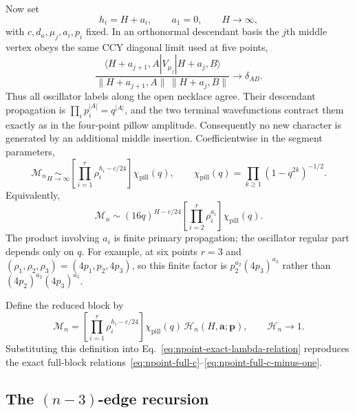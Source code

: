 \documentclass[11pt]{article}
\newcommand{\cH}{\mathcal H}
\newcommand{\cM}{\mathcal M}
\begin{document}
Now set
\begin{equation}
 h_i=H+a_i,\qquad a_1=0,\qquad H\longrightarrow\infty,
 \label{eq:npoint-diagonal-limit}
\end{equation}
with $c,d_a,\mu_j,a_i,p_i$ fixed.  In an orthonormal descendant basis the
$j$th middle vertex obeys the same CCY diagonal limit used at five points,
\begin{equation}
 \frac{\langle H+a_{j+1},A|V_{\mu_j}|H+a_j,B\rangle}
 {\|H+a_{j+1},A\|\,\|H+a_j,B\|}
 \longrightarrow\delta_{AB}.
 \label{eq:npoint-diagonal-vertex}
\end{equation}
Thus all oscillator labels along the open necklace agree.  Their descendant
propagation is
$\prod_i p_i^{|A|}=q^{|A|}$, and the two terminal wavefunctions contract
them exactly as in the four-point pillow amplitude.  Consequently no new
character is generated by an additional middle insertion.  Coefficientwise
in the segment parameters,
\begin{equation}
\boxed{
 \cM_n
 \underset{H\to\infty}{\sim}
 \left[\prod_{i=1}^{r}\rho_i^{h_i-c/24}\right]
 \chi_{\mathrm{pill}}(q),
 \qquad
 \chi_{\mathrm{pill}}(q)=
 \prod_{k\geq1}(1-q^{2k})^{-1/2}.}
 \label{eq:npoint-large-h}
\end{equation}
Equivalently,
\begin{equation}
 \cM_n\sim
 (16q)^{H-c/24}
 \left[\prod_{i=2}^{r}\rho_i^{a_i}\right]
 \chi_{\mathrm{pill}}(q).
 \label{eq:npoint-large-h-fixed-differences}
\end{equation}
The product involving $a_i$ is finite primary propagation; the oscillator
regular part depends only on $q$.  For example, at six points
$r=3$ and $(\rho_1,\rho_2,\rho_3)=(4p_1,p_2,4p_3)$, so this finite factor is
$p_2^{a_2}(4p_3)^{a_3}$ rather than $(4p_2)^{a_2}(4p_3)^{a_3}$.

Define the reduced block by
\begin{equation}
 \cM_n=
 \left[\prod_{i=1}^{r}\rho_i^{h_i-c/24}\right]
 \chi_{\mathrm{pill}}(q)\,
 \cH_n(H,\boldsymbol a;\boldsymbol p),
 \qquad \cH_n\longrightarrow1.
 \label{eq:npoint-reduced-block}
\end{equation}
Substituting this definition into
Eq.~\eqref{eq:npoint-exact-lambda-relation} reproduces the exact full-block
relations~\eqref{eq:npoint-full-c}--\eqref{eq:npoint-full-c-minus-one}.

\subsection{The \texorpdfstring{$(n-3)$}{(n-3)}-edge recursion}
\end{document}
